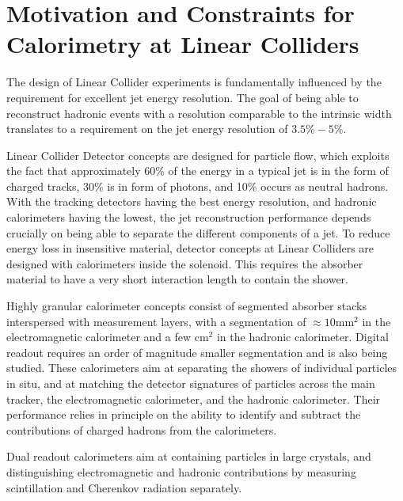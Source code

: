 \section{Motivation and Constraints for Calorimetry at Linear Colliders}

The design of Linear Collider experiments is fundamentally influenced by the requirement for excellent jet energy resolution. The goal of being able to reconstruct hadronic \PZ events with a resolution comparable to the intrinsic width translates to a requirement on the jet energy resolution of $3.5\%-5\%$.

Linear Collider Detector concepts are designed for particle flow, which exploits the fact that approximately 60\% of the energy in a typical jet is in the form of charged tracks, 30\% is in form of photons, and 10\% occurs as neutral hadrons. With the tracking detectors having the best energy resolution, and hadronic calorimeters having the lowest, the jet reconstruction performance depends crucially on being able to separate the different components of a jet. To reduce energy loss in insensitive material, detector concepts at Linear Colliders are designed with calorimeters inside the solenoid. This requires the absorber material to have a very short interaction length to contain the shower.

Highly granular calorimeter concepts consist of segmented absorber stacks interspersed with measurement layers, with a segmentation of $\approx 10\text{mm}^2$ in the electromagnetic calorimeter and a few $\text{cm}^2$ in the hadronic calorimeter. Digital readout requires an order of magnitude smaller segmentation and is also being studied. These calorimeters aim at separating the showers of individual particles in situ, and at matching the detector signatures of particles across the main tracker, the electromagnetic calorimeter, and the hadronic calorimeter. Their performance relies in principle on the ability to identify and subtract the contributions of charged hadrons from the calorimeters.

Dual readout calorimeters aim at containing particles in large crystals, and distinguishing electromagnetic and hadronic contributions by measuring scintillation and Cherenkov radiation separately.
